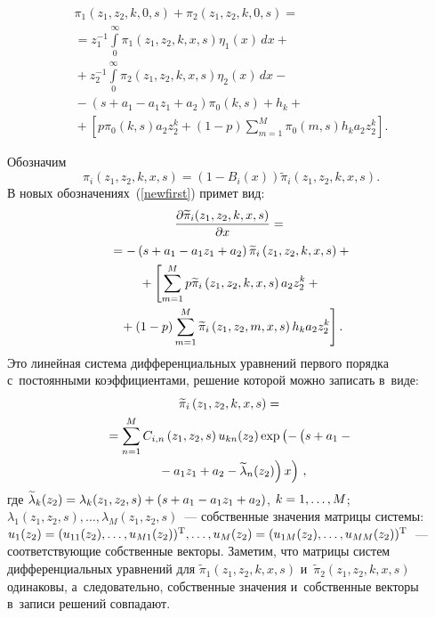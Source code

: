 \begin{multicols}{2}
\noindent
\begin{multline}
\pi_1\left(z_1,z_2,k,0,s\right)+
\pi_2\left(z_1,z_2,k,0,s\right)={}\\
{}=
z_1^{-1}\int\limits_0^{\infty}\pi_1\left(z_1,z_2,k,x,s\right)\eta_1(x)\,dx+{}\\
{}+z_2^{-1}\int\limits_0^{\infty}\pi_2(z_1,z_2,k,x,s)\eta_2(x)\,dx-{}\\
{}-
\left(s+a_1-a_1 z_1+a_2\right)\pi_0(k,s)+h_k+{}\\
\!\!\!{}+\left[p\pi_0(k,s)a_2 z_2^k+(1-p)\!\sum\limits_{m=1}^{M}\!
\pi_0(m,s)h_k a_2 z_2^k\right].\!\!
\label{newsecond}
\end{multline}

\vspace*{-12pt}

\pagebreak

Обозначим
$$
\pi_i\left(z_1,z_2,k,x,s\right)=\left(1-B_i(x)\right)\widetilde{\pi}_i\left(z_1,z_2,k,x,s\right).
$$
В новых обозначениях~(\ref{newfirst}) примет вид:
\begin{multline}
\displaystyle\frac{\displaystyle \partial\widetilde{\pi}_i(z_1,z_2,k,x,s)\mathstrut}{\displaystyle \partial x\mathstrut}={}\\
{}=
-\left(s+a_1-a_1 z_1+a_2\right)\widetilde{\pi}_i\left(z_1,z_2,k,x,s\right)+{}\\
{}+\left[
\sum\limits_{m=1}^{M}
p\widetilde{\pi}_i\left(z_1,z_2,k,x,s\right)a_2 z_2^k+{}\right.\\
\left.{}+(1-p)
\sum\limits_{m=1}^{M}\widetilde{\pi}_i\left(z_1,z_2,m,x,s\right)
h_k a_2 z_2^k\right].
\label{system}
\end{multline}
Это линейная система дифференциальных уравнений первого порядка 
с~постоянными коэффициентами, решение которой можно записать в~виде:
\begin{multline}
\widetilde{\pi}_i\left(z_1,z_2,k,x,s\right)={}\\
{}=\sum\limits_{n=1}^{M}C_{i,n}\left(z_1,z_2,s\right)u_{kn}(z_2)
\exp\left(-\left(
\vphantom{\tilde{\lambda}_n}
s+a_1-{}\right.\right.\\
\left.\left.{}-a_1 z_1+a_2-\widetilde{\lambda}_n(z_2)\right)x\right)\,,
\label{solution}
\end{multline}
где $\widetilde{\lambda}_k(z_2)\hm=\lambda_k(z_1,z_2,s)\hm+(s\hm+a_1\hm-a_1 z_1\hm+a_2)$, 
$k\hm=1,\ldots,M$; $\lambda_1(z_1,z_2,s),\ldots,\lambda_M(z_1,z_2,s)$~--- 
собственные значения матрицы системы: 
$u_1(z_2)\hm=(u_{11}(z_2),\ldots,u_{M1}(z_2))^{\mathrm{T}},\ldots,u_M(z_2)
\hm=(u_{1M}(z_2),\ldots,u_{MM}(z_2))^{\mathrm{T}}$~--- соответствующие собственные векторы. 
Заметим, что матрицы систем дифференциальных уравнений для 
$\widetilde{\pi}_1(z_1,z_2,k,x,s)$ и~$\widetilde{\pi}_2(z_1,z_2,k,x,s)$ одинаковы, 
а~следовательно, собственные значения и~собственные векторы в~записи решений совпадают.


\end{multicols}
